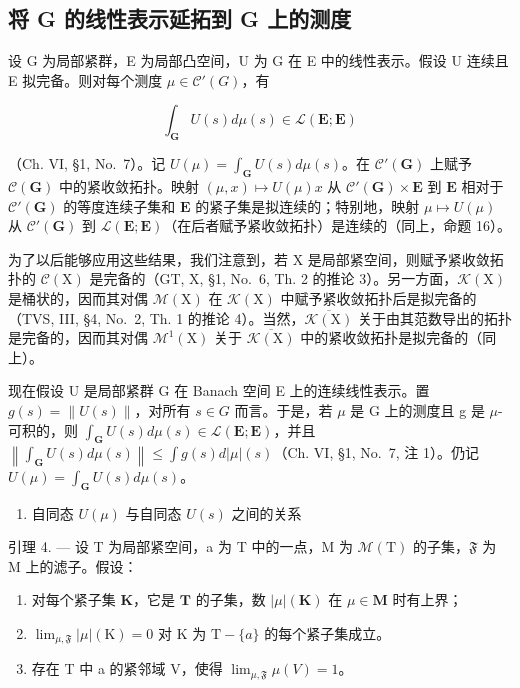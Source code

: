 \subsection{将 G 的线性表示延拓到 G 上的测度}

设 G 为局部紧群，E 为局部凸空间，U 为 G 在 E 中的线性表示。假设 U 连续且 E 拟完备。则对每个测度 \(\mu \in \mathcal{C}'(G)\)，有

\[
\int_ {\mathbf {G}} U (s) d \mu (s) \in \mathcal {L} (\mathbf {E}; \mathbf {E})
\]

（Ch. VI, §1, No.~7）。记 \(U(\mu) = \int_{\mathbf{G}} U(s) d\mu(s)\)。在 \(\mathcal{C}'(\mathbf{G})\) 上赋予 \(\mathcal{C}(\mathbf{G})\) 中的紧收敛拓扑。映射 \((\mu, x) \mapsto U(\mu)x\) 从 \(\mathcal{C}'(\mathbf{G}) \times \mathbf{E}\) 到 \(\mathbf{E}\) 相对于 \(\mathcal{C}'(\mathbf{G})\) 的等度连续子集和 \(\mathbf{E}\) 的紧子集是拟连续的；特别地，映射 \(\mu \mapsto U(\mu)\) 从 \(\mathcal{C}'(\mathbf{G})\) 到 \(\mathcal{L}(\mathbf{E}; \mathbf{E})\)（在后者赋予紧收敛拓扑）是连续的（同上，命题 16）。

为了以后能够应用这些结果，我们注意到，若 X 是局部紧空间，则赋予紧收敛拓扑的 \(\mathcal{C}(\mathrm{X})\) 是完备的（GT, X, §1, No.~6, Th. 2 的推论 3）。另一方面，\(\mathcal{K}(\mathrm{X})\) 是桶状的，因而其对偶 \(\mathcal{M}(\mathrm{X})\) 在 \(\mathcal{K}(\mathrm{X})\) 中赋予紧收敛拓扑后是拟完备的（TVS, III, §4, No.~2, Th. 1 的推论 4）。当然，\(\overline{\mathcal{K}(\mathrm{X})}\) 关于由其范数导出的拓扑是完备的，因而其对偶 \(\mathcal{M}^{1}(\mathrm{X})\) 关于 \(\overline{\mathcal{K}(\mathrm{X})}\) 中的紧收敛拓扑是拟完备的（同上）。

现在假设 U 是局部紧群 G 在 Banach 空间 E 上的连续线性表示。置 \(g(s) = \|U(s)\|\)，对所有 \(s \in G\) 而言。于是，若 \(\mu\) 是 G 上的测度且 g 是 \(\mu\)-可积的，则 \(\int_{\mathbf{G}} U(s) d\mu(s) \in \mathcal{L}(\mathbf{E}; \mathbf{E})\)，并且 \(\left\|\int_{\mathbf{G}} U(s) d\mu(s)\right\| \leqslant \int g(s) d|\mu|(s)\)（Ch. VI, §1, No.~7, 注 1）。仍记 \(U(\mu) = \int_{\mathbf{G}} U(s) d\mu(s)\)。

\begin{enumerate}
\def\labelenumi{\arabic{enumi}.}
\setcounter{enumi}{6}
\tightlist
\item
  自同态 \(U(\mu)\) 与自同态 \(U(s)\) 之间的关系
\end{enumerate}

引理 4. --- 设 T 为局部紧空间，a 为 T 中的一点，M 为 \(\mathcal{M}(\mathrm{T})\) 的子集，\(\mathfrak{F}\) 为 M 上的滤子。假设：

\begin{enumerate}
\def\labelenumi{(\roman{enumi})}
\item
  对每个紧子集 \(\mathbf{K}\)，它是 \(\mathbf{T}\) 的子集，数 \(|\mu|(\mathbf{K})\) 在 \(\mu \in \mathbf{M}\) 时有上界；
\item
  \(\lim_{\mu, \mathfrak{F}} |\mu| (\mathrm{K}) = 0\) 对 \(\mathrm{K}\) 为 \(\mathrm{T} - \{a\}\) 的每个紧子集成立。
\item
  存在 T 中 a 的紧邻域 V，使得 \(\lim_{\mu, \mathfrak{F}} \mu(V) = 1\)。
\end{enumerate}

